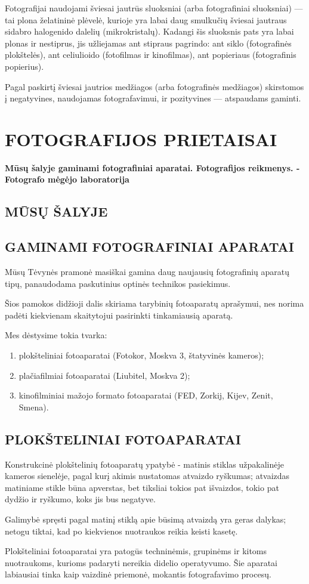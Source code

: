 \documentclass{book}
\begin{document}
				Fotografijai naudojami šviesai jautrūs sluoksniai (arba fotografiniai sluoksniai) --- tai plona želatininė plėvelė, kurioje yra labai daug smulkučių šviesai jautraus sidabro halogenido dalelių (mikrokristalų). Kadangi šis sluoksnis pats yra labai plonas ir nestiprus, jis užliejamas ant stipraus pagrindo: ant siklo (fotografinės plokštelės), ant celiulioido (fotofilmas ir kinofilmas), ant popieriaus (fotografinis popierius).

				Pagal paskirtį šviesai jautrios medžiagos (arba fotografinės medžiagos) skirstomos į negatyvines, naudojamas fotografavimui, ir pozityvines --- atspaudams gaminti.



	\chapter{FOTOGRAFIJOS PRIETAISAI}
		\textbf{Mūsų šalyje gaminami fotografiniai aparatai. Fotografijos reikmenys. - Fotografo mėgėjo laboratorija}
		\section*{MŪSŲ ŠALYJE}
		\section*{GAMINAMI FOTOGRAFINIAI APARATAI}
			Mūsų Tėvynės pramonė masiškai gamina daug naujausių fotografinių aparatų tipų, panaudodama paskutinius optinės technikos pasiekimus.

			Šios pamokos didžioji dalis skiriama tarybinių fotoaparatų aprašymui, nes norima padėti kiekvienam skaitytojui pasirinkti tinkamiausią aparatą.

			Mes dėstysime tokia tvarka:
			\begin{enumerate}
				\item plokšteliniai fotoaparatai (Fotokor, Moskva 3, štatyvinės kameros);
				\item plačiafilmiai fotoaparatai (Liubitel, Moskva 2);
				\item kinofilminiai mažojo formato fotoaparatai (FED, Zorkij, Kijev, Zenit, Smena).
			\end{enumerate}
		\section*{PLOKŠTELINIAI FOTOAPARATAI}
			Konstrukcinė plokštelinių fotoaparatų ypatybė - matinis stiklas užpakalinėje kameros sienelėje, pagal kurį akimis nustatomas atvaizdo ryškumas; atvaizdas matiniame stikle būna apverstas, bet tiksliai tokios pat išvaizdos, tokio pat dydžio ir ryškumo, koks jis bus negatyve.

			Galimybė spręsti pagal matinį stiklą apie būsimą atvaizdą yra geras dalykas; netogu tiktai, kad po kiekvienos nuotraukos reikia keisti kasetę.

			Plokšteliniai fotoaparatai yra patogūs techninėmis, grupinėms ir kitoms nuotraukoms, kurioms padaryti nereikia didelio operatyvumo. Šie aparatai labiausiai tinka kaip vaizdinė priemonė, mokantis fotografavimo procesų.
\end{document}
